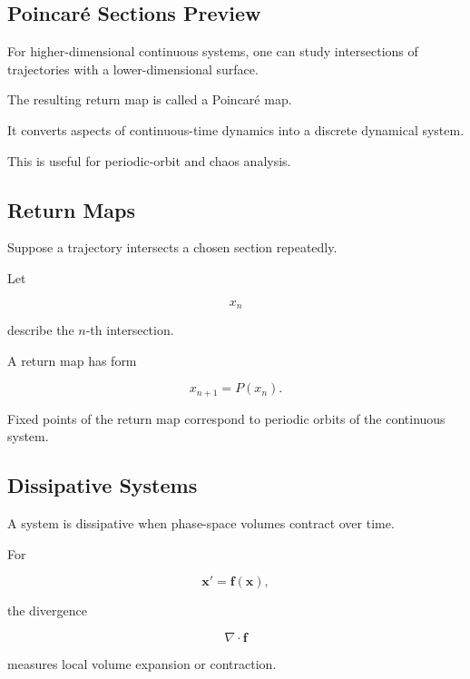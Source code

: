 \subsection{Poincaré Sections Preview}
\label{subsec:poincare-sections-preview}

For higher-dimensional continuous systems, one can study intersections of
trajectories with a lower-dimensional surface.

The resulting return map is called a Poincaré map.

It converts aspects of continuous-time dynamics into a discrete
dynamical system.

This is useful for periodic-orbit and chaos analysis.

\subsection{Return Maps}
\label{subsec:return-maps}

Suppose a trajectory intersects a chosen section repeatedly.

Let

\[
x_n
\]

describe the \(n\)-th intersection.

A return map has form

\[
\boxed{
x_{n+1}
=
P(x_n).
}
\]

Fixed points of the return map correspond to periodic orbits of the
continuous system.

\subsection{Dissipative Systems}
\label{subsec:dissipative-systems}

A system is dissipative when phase-space volumes contract over time.

For

\[
\mathbf{x}'
=
\mathbf{f}(\mathbf{x}),
\]

the divergence

\[
\boxed{
\nabla\cdot\mathbf{f}
}
\]

measures local volume expansion or contraction.

